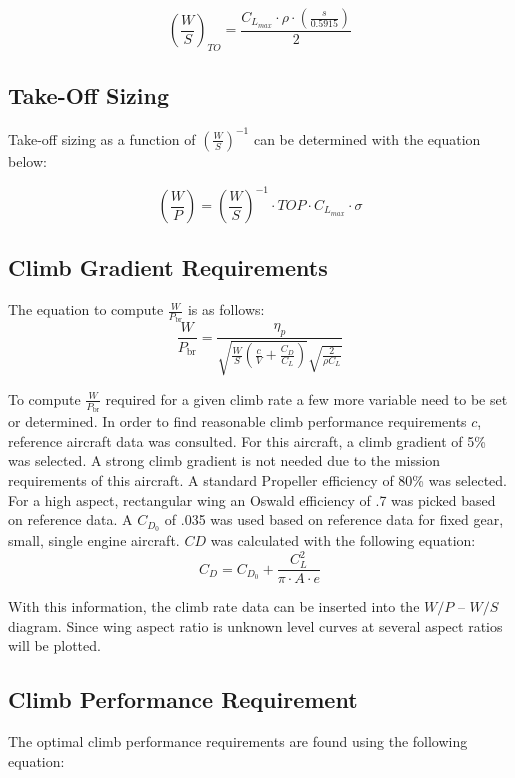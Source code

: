 \documentclass[12pt]{article}
\begin{document}
	\begin{equation}
		\left(\frac{W}{S}\right)_{TO} = \frac{C_{L_{max}} \cdot \rho \cdot \left(\frac{s}{0.5915}\right)}{2}
	\end{equation}
	\subsection{Take-Off Sizing}
	
	Take-off sizing as a function of $\left(\frac{W}{S}\right)^{-1}$ can be determined with the equation below:
	
	\begin{equation}
		\left(\frac{W}{P}\right) = \left(\frac{W}{S}\right)^{-1} \cdot TOP \cdot C_{L_{max}} \cdot \sigma
	\end{equation}
	

	\subsection{Climb Gradient Requirements}
	 The equation to compute $\frac{W}{P_{\text{br}}}$ is as follows:
	\begin{equation}
		\frac{W}{P_{\text{br}}} = \frac{\eta_p}{\sqrt{\frac{W}{S} \left( \frac{c}{V} + \frac{C_D}{C_L} \right)} \sqrt{\frac{2}{\rho C_L}}}
	\end{equation}
	
	To compute $\frac{W}{P_{\text{br}}}$ required for a given climb rate a few more variable need to be set or determined. In order to find reasonable climb performance requirements $c$, reference aircraft data was consulted. For this aircraft, a climb gradient of 5\% was selected. A strong climb gradient is not needed due to the mission requirements of this aircraft. A standard Propeller efficiency of 80\% was selected. For a high aspect, rectangular wing an Oswald efficiency of .7 was picked based on reference data. A $C_{D_0}$ of .035 was used based on reference data for fixed gear, small, single engine aircraft. $CD$ was calculated with the following equation:
	\begin{equation}
		C_D = C_{D_0} + \frac{C_L^2}{\pi \cdot A \cdot e}
	\end{equation}
	
	With this information, the climb rate data can be inserted into the $W/P$ – $W/S$ diagram. Since wing aspect ratio is unknown level curves at several aspect ratios will be plotted.
	
	\subsection{Climb Performance Requirement}
	The optimal climb performance requirements are found using the following equation:
	
\end{document}

